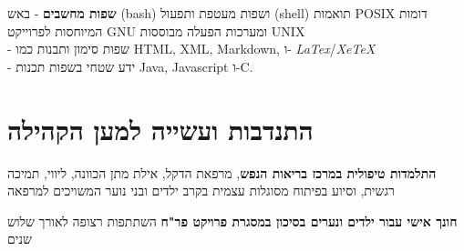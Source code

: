 {\textbf{שפות מחשבים}}
{- באש (bash) ושפות מעטפת ותפעול (shell) תואמות POSIX דומות המיוחסות לפרוייקט GNU ומערכות הפעלה מבוססות UNIX \\ 
	- שפות סימון ותבנות כמו HTML, XML, Markdown, ו-
	\textit{LaTex}/\textit{XeTeX} \\
	- ידע שטחי בשפות תכנות Java, Javascript ו-C.}
{}

\section{התנדבות ועשייה למען הקהילה}

{\textbf{התלמדות טיפולית במרכז בריאות הנפש}, מרפאת הדקל, אילת}
{מתן הכוונה, ליווי, תמיכה רגשית, וסיוע בפיתוח מסוגלות עצמית בקרב ילדים ובני נוער המשויכים למרפאה}
{}

{\textbf{חונך אישי עבור ילדים ונערים בסיכון במסגרת פרויקט פר"ח}}
{השתתפות רצופה לאורך שלוש שנים}
{}		
\unsetRTL
